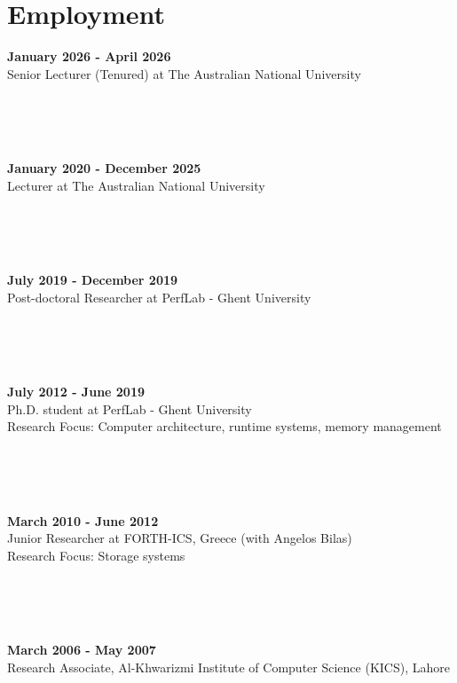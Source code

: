 \documentclass[singlecolumn,singlespace,11pt,a4paper]{article}
\begin{document}
\section*{Employment}
\begin{minipage}{\linewidth}
\noindent \textbf{January 2026 - April 2026}\\
Senior Lecturer (Tenured) at The Australian National University \\
\end{minipage}
\\
\\
\\
\begin{minipage}{\linewidth}
\noindent \textbf{January 2020 - December 2025}\\
Lecturer at The Australian National University \\
\end{minipage}
\\
\\
\\
\begin{minipage}{\linewidth}
\noindent \textbf{July 2019 - December 2019}\\
Post-doctoral Researcher at PerfLab - Ghent University \\
\end{minipage}
\\
\\
\\
\begin{minipage}{\linewidth}
\noindent \textbf{July 2012 - June 2019}\\
Ph.D. student at PerfLab - Ghent University \\
Research Focus: Computer architecture, runtime systems, memory management
\end{minipage}
\\
\\
\\
\begin{minipage}{\linewidth}
\noindent \textbf{March 2010 - June 2012}\\
Junior Researcher at FORTH-ICS, Greece (with Angelos Bilas) \\
Research Focus: Storage systems
\end{minipage}
\\
\\
\\
\begin{minipage}{\linewidth}
\noindent \textbf{March 2006 - May 2007}\\
Research Associate, Al-Khwarizmi Institute of Computer Science (KICS), Lahore\\
\end{minipage}
\end{document}
